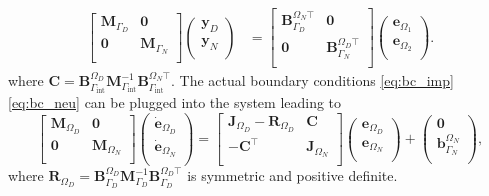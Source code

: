 \begin{equation}
\begin{aligned}
\begin{bmatrix}
\mathbf{M}_{\Gamma_D} & \mathbf{0}  \\
\mathbf{0} & \mathbf{M}_{\Gamma_N} \\
\end{bmatrix}
\begin{pmatrix}
\mathbf{y}_{D} \\
\mathbf{y}_{N} \\
\end{pmatrix}
&= 
\begin{bmatrix}
\mathbf{B}_{\Gamma_D}^{\Omega_N \top} & \mathbf{0} \\
\mathbf{0} & \mathbf{B}_{\Gamma_N}^{\Omega_D \top} \\
\end{bmatrix}\begin{pmatrix}
{\mathbf{e}}_{\Omega_1} \\
{\mathbf{e}}_{\Omega_2} \\
\end{pmatrix}.
\end{aligned}
\end{equation}
where $\mathbf{C} = \mathbf{B}_{\Gamma_{\text{int}}}^{\Omega_D} \mathbf{M}_{\Gamma_{\text{int}}}^{-1} \mathbf{B}_{\Gamma_{\text{int}}}^{\Omega_N \top}$. The actual boundary conditions \eqref{eq:bc_imp} \eqref{eq:bc_neu} can be plugged into the system leading to 
\begin{equation}\label{eq:pHfindim_waves_phode_bc}
\begin{bmatrix}
\mathbf{M}_{\Omega_D} & \mathbf{0} \\
\mathbf{0} & \mathbf{M}_{\Omega_N} \\
\end{bmatrix}
\begin{pmatrix}
\dot{\mathbf{e}}_{\Omega_D} \\
\dot{\mathbf{e}}_{\Omega_N} \\
\end{pmatrix}
= \begin{bmatrix}
\mathbf{J}_{\Omega_D} - \mathbf{R}_{\Omega_D}  & \mathbf{C}\\
-\mathbf{C}^\top & \mathbf{J}_{\Omega_N} \\
\end{bmatrix} 
\begin{pmatrix}
{\mathbf{e}}_{\Omega_D} \\
{\mathbf{e}}_{\Omega_N} \\
\end{pmatrix} + 
\begin{pmatrix}
\mathbf{0}\\
\mathbf{b}_{\Gamma_N}^{\Omega_N}\\
\end{pmatrix},
\end{equation}
where $\mathbf{R}_{\Omega_D} = \mathbf{B}_{\Gamma_D}^{\Omega_D} \mathbf{M}_{\Gamma_D}^{-1} \mathbf{B}_{\Gamma_D}^{\Omega_D \top}$ is symmetric and positive definite.

